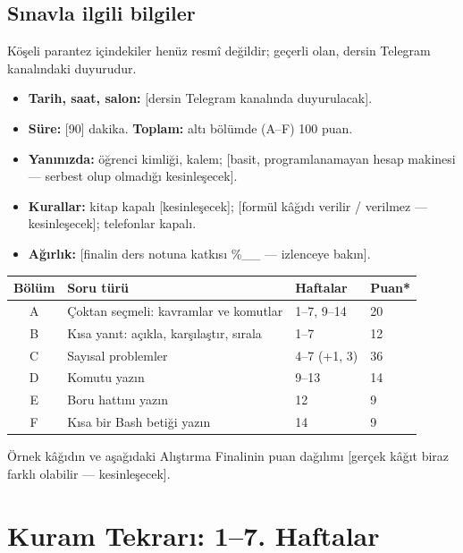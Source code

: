\subsection{Sınavla ilgili bilgiler}
Köşeli parantez içindekiler henüz resmî değildir; geçerli olan, dersin Telegram kanalındaki duyurudur.
\begin{itemize}
  \item \textbf{Tarih, saat, salon:} [dersin Telegram kanalında duyurulacak].
  \item \textbf{Süre:} [90] dakika. \textbf{Toplam:} altı bölümde (A--F) 100 puan.
  \item \textbf{Yanınızda:} öğrenci kimliği, kalem; [basit, programlanamayan hesap makinesi --- serbest olup olmadığı kesinleşecek].
  \item \textbf{Kurallar:} kitap kapalı [kesinleşecek]; [formül kâğıdı verilir / verilmez --- kesinleşecek]; telefonlar kapalı.
  \item \textbf{Ağırlık:} [finalin ders notuna katkısı \%\_\_ --- izlenceye bakın].
\end{itemize}

\begin{center}
\renewcommand{\arraystretch}{1.2}
\begin{tabularx}{\linewidth}{@{}c>{\raggedright\arraybackslash}Xll@{}}
\toprule
\textbf{Bölüm} & \textbf{Soru türü} & \textbf{Haftalar} & \textbf{Puan*} \\
\midrule
A & Çoktan seçmeli: kavramlar ve komutlar & 1--7, 9--14 & 20 \\
B & Kısa yanıt: açıkla, karşılaştır, sırala & 1--7 & 12 \\
C & Sayısal problemler & 4--7 (+1, 3) & 36 \\
D & Komutu yazın & 9--13 & 14 \\
E & Boru hattını yazın & 12 & 9 \\
F & Kısa bir Bash betiği yazın & 14 & 9 \\
\bottomrule
\end{tabularx}
\end{center}
{\small *Örnek kâğıdın ve aşağıdaki Alıştırma Finalinin puan dağılımı [gerçek kâğıt biraz farklı olabilir --- kesinleşecek].}

\section{Kuram Tekrarı: 1--7. Haftalar}
\label{sec:theory}

